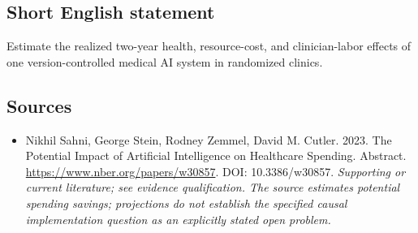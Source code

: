 \documentclass[11pt]{article}
\begin{document}
\subsection{Short English statement}
Estimate the realized two-year health, resource-cost, and clinician-labor effects of one version-controlled medical AI system in randomized clinics.

\subsection{Sources}
\begin{itemize}\raggedright
\item[\textnormal{[S1]}]\hypertarget{source:30007729:1}{} Nikhil Sahni, George Stein, Rodney Zemmel, David M. Cutler. 2023. The Potential Impact of Artificial Intelligence on Healthcare Spending. Abstract.
\url{https://www.nber.org/papers/w30857}.
DOI: 10.3386/w30857.
{\small\textit{Supporting or current literature; see evidence qualification. The source estimates potential spending savings; projections do not establish the specified causal implementation question as an explicitly stated open problem.}}
\end{itemize}
\end{document}
